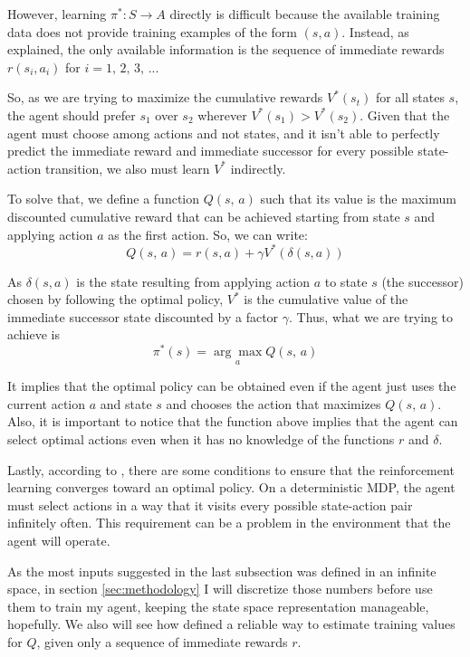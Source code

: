 \documentclass[a4paper]{article}
\begin{document}
However, learning $\pi^{*}: S \rightarrow A$ directly is difficult because the available training data does not provide training examples of the form $(s, a)$. Instead, as \cite{Mitchell} explained, the only available information is the sequence of immediate rewards $r(s_i, a_i)$ for $i=1,\, 2,\, 3,\,...$

So, as we are trying to maximize the cumulative rewards $V^{*}(s_t)$ for all states $s$, the agent should prefer $s_1$ over $s_2$ wherever $V^{*}(s_1) > V^{*}(s_2)$. Given that the agent must choose among actions and not states, and it isn't able to perfectly predict the immediate reward and immediate successor for every possible state-action transition, we also must learn $V^{*}$ indirectly.

To solve that, we define a function $Q(s, \, a)$ such that its value is the maximum discounted cumulative reward that can be achieved starting from state $s$ and applying action $a$ as the first action. So, we can write:
$$Q(s, \, a) = r(s, a) + \gamma V^{*}(\delta(s, a))$$

As $\delta(s, a)$ is the state resulting from applying action $a$ to state $s$ (the successor) chosen by following the optimal policy, $V^{*}$ is the cumulative value of the immediate successor state discounted by a factor $\gamma$. Thus,  what we are trying to achieve is
$$\pi^{*}(s) = \underset{a}{\arg \max} Q(s, \, a)$$

It implies that the optimal policy can be obtained even if the agent just uses the current action $a$ and state $s$ and chooses the action that maximizes $Q(s,\, a)$. Also, it is important to notice that the function above implies that the agent can select optimal actions even when it has no knowledge of the functions $r$ and $\delta$.

Lastly, according to \cite{Mitchell}, there are some conditions to ensure that the reinforcement learning converges toward an optimal policy. On a deterministic MDP, the agent must select actions in a way that it visits every possible state-action pair infinitely often. This requirement can be a problem in the environment that the agent will operate.

As the most inputs suggested in the last subsection was defined in an infinite space, in section \ref{sec:methodology} I will discretize those numbers before use them to train my agent, keeping the state space representation manageable, hopefully. We also will see how \cite{Mitchell} defined a reliable way to estimate training values for $Q$, given only a sequence of immediate rewards $r$.
\end{document}
